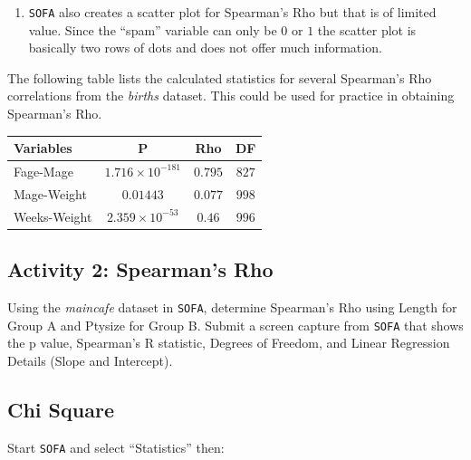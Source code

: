 \begin{enumerate}
  \item \texttt{SOFA} also creates a scatter plot for Spearman's Rho but that is of limited value. Since the ``spam'' variable can only be $ 0 $ or $ 1 $ the scatter plot is basically two rows of dots and does not offer much information.
  
\end{enumerate}

The following table lists the calculated statistics for several Spearman's Rho correlations from the \textit{births} dataset. This could be used for practice in obtaining Spearman's Rho.

\begin{center}
  \begin{tabular}{lccc}
    \hline 
    \textbf{Variables} & \textbf{P} & \textbf{Rho} & \textbf{DF} \\ 
    \hline 
    Fage-Mage    & $ 1.716 \times 10^{-181} $ & $ 0.795 $ & $ 827 $ \\ 
    Mage-Weight  & $ 0.01443 $       & $ 0.077 $ & $ 998 $ \\ 
    Weeks-Weight & $ 2.359 \times 10^{-53}  $ & $ 0.46  $ & $ 996 $ \\ 
    \hline 
  \end{tabular} 
\end{center}

\subsection{Activity 2: Spearman's Rho} \label{cor:act02}

Using the \textit{maincafe} dataset in \texttt{SOFA}, determine Spearman's Rho using Length for Group A and Ptysize for Group B. Submit a screen capture from \texttt{SOFA} that shows the p value, Spearman's R statistic, Degrees of Freedom, and Linear Regression Details (Slope and Intercept). 

\subsection{Chi Square}\label{cor:chi_square_proc}

Start \texttt{SOFA} and select ``Statistics'' then:

